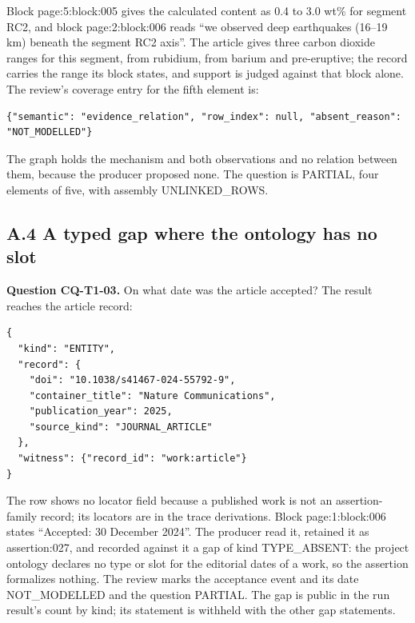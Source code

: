\par\medskip
\noindent\begin{minipage}{\linewidth}
Block page:5:block:005 gives the calculated content as 0.4 to 3.0 wt\% for segment RC2, and block page:2:block:006 reads “we observed deep earthquakes (16–19 km) beneath the segment RC2 axis”. The article gives three carbon dioxide ranges for this segment, from rubidium, from barium and pre-eruptive; the record carries the range its block states, and support is judged against that block alone. The review's coverage entry for the fifth element is:

\begin{lstlisting}
{"semantic": "evidence_relation", "row_index": null, "absent_reason": "NOT_MODELLED"}
\end{lstlisting}
\end{minipage}\par\medskip

The graph holds the mechanism and both observations and no relation between them, because the producer proposed none. The question is PARTIAL, four elements of five, with assembly UNLINKED\_\allowbreak{}ROWS.

\subsection*{A.4 A typed gap where the ontology has no slot}

\par\medskip
\noindent\begin{minipage}{\linewidth}
\textbf{Question CQ-T1-03.} On what date was the article accepted? The result reaches the article record:

\begin{lstlisting}
{
  "kind": "ENTITY",
  "record": {
    "doi": "10.1038/s41467-024-55792-9",
    "container_title": "Nature Communications",
    "publication_year": 2025,
    "source_kind": "JOURNAL_ARTICLE"
  },
  "witness": {"record_id": "work:article"}
}
\end{lstlisting}
\end{minipage}\par\medskip

The row shows no locator field because a published work is not an assertion-family record; its locators are in the trace derivations. Block page:1:block:006 states “Accepted: 30 December 2024”. The producer read it, retained it as assertion:027, and recorded against it a gap of kind TYPE\_\allowbreak{}ABSENT: the project ontology declares no type or slot for the editorial dates of a work, so the assertion formalizes nothing. The review marks the acceptance event and its date NOT\_\allowbreak{}MODELLED and the question PARTIAL. The gap is public in the run result's count by kind; its statement is withheld with the other gap statements.

